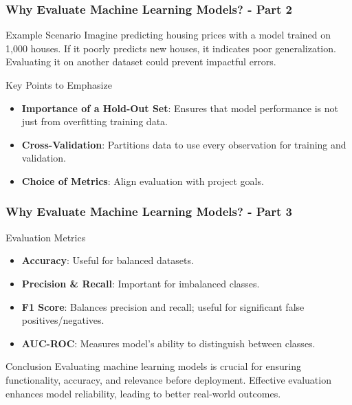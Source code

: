 \documentclass[aspectratio=169]{beamer}
\begin{document}
\begin{frame}[fragile]
    \frametitle{Why Evaluate Machine Learning Models? - Part 2}
    \begin{block}{Example Scenario}
        Imagine predicting housing prices with a model trained on 1,000 houses. If it poorly predicts new houses, it indicates poor generalization. Evaluating it on another dataset could prevent impactful errors.
    \end{block}

    \begin{block}{Key Points to Emphasize}
        \begin{itemize}
            \item \textbf{Importance of a Hold-Out Set}: Ensures that model performance is not just from overfitting training data.
            \item \textbf{Cross-Validation}: Partitions data to use every observation for training and validation.
            \item \textbf{Choice of Metrics}: Align evaluation with project goals.
        \end{itemize}
    \end{block}
\end{frame}

\begin{frame}[fragile]
    \frametitle{Why Evaluate Machine Learning Models? - Part 3}
    \begin{block}{Evaluation Metrics}
        \begin{itemize}
            \item \textbf{Accuracy}: Useful for balanced datasets.
            \item \textbf{Precision \& Recall}: Important for imbalanced classes.
            \item \textbf{F1 Score}: Balances precision and recall; useful for significant false positives/negatives.
            \item \textbf{AUC-ROC}: Measures model's ability to distinguish between classes.
        \end{itemize}
    \end{block}

    \begin{block}{Conclusion}
        Evaluating machine learning models is crucial for ensuring functionality, accuracy, and relevance before deployment. Effective evaluation enhances model reliability, leading to better real-world outcomes.
    \end{block}
\end{frame}
\end{document}
